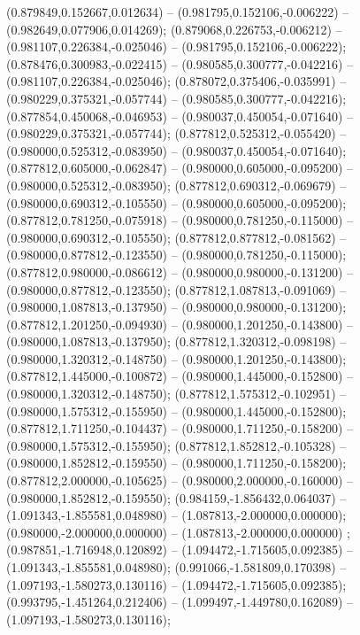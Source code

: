  (0.879849,0.152667,0.012634) -- (0.981795,0.152106,-0.006222) -- (0.982649,0.077906,0.014269);
 (0.879068,0.226753,-0.006212) -- (0.981107,0.226384,-0.025046) -- (0.981795,0.152106,-0.006222);
 (0.878476,0.300983,-0.022415) -- (0.980585,0.300777,-0.042216) -- (0.981107,0.226384,-0.025046);
 (0.878072,0.375406,-0.035991) -- (0.980229,0.375321,-0.057744) -- (0.980585,0.300777,-0.042216);
 (0.877854,0.450068,-0.046953) -- (0.980037,0.450054,-0.071640) -- (0.980229,0.375321,-0.057744);
 (0.877812,0.525312,-0.055420) -- (0.980000,0.525312,-0.083950) -- (0.980037,0.450054,-0.071640);
 (0.877812,0.605000,-0.062847) -- (0.980000,0.605000,-0.095200) -- (0.980000,0.525312,-0.083950);
 (0.877812,0.690312,-0.069679) -- (0.980000,0.690312,-0.105550) -- (0.980000,0.605000,-0.095200);
 (0.877812,0.781250,-0.075918) -- (0.980000,0.781250,-0.115000) -- (0.980000,0.690312,-0.105550);
 (0.877812,0.877812,-0.081562) -- (0.980000,0.877812,-0.123550) -- (0.980000,0.781250,-0.115000);
 (0.877812,0.980000,-0.086612) -- (0.980000,0.980000,-0.131200) -- (0.980000,0.877812,-0.123550);
 (0.877812,1.087813,-0.091069) -- (0.980000,1.087813,-0.137950) -- (0.980000,0.980000,-0.131200);
 (0.877812,1.201250,-0.094930) -- (0.980000,1.201250,-0.143800) -- (0.980000,1.087813,-0.137950);
 (0.877812,1.320312,-0.098198) -- (0.980000,1.320312,-0.148750) -- (0.980000,1.201250,-0.143800);
 (0.877812,1.445000,-0.100872) -- (0.980000,1.445000,-0.152800) -- (0.980000,1.320312,-0.148750);
 (0.877812,1.575312,-0.102951) -- (0.980000,1.575312,-0.155950) -- (0.980000,1.445000,-0.152800);
 (0.877812,1.711250,-0.104437) -- (0.980000,1.711250,-0.158200) -- (0.980000,1.575312,-0.155950);
 (0.877812,1.852812,-0.105328) -- (0.980000,1.852812,-0.159550) -- (0.980000,1.711250,-0.158200);
 (0.877812,2.000000,-0.105625) -- (0.980000,2.000000,-0.160000) -- (0.980000,1.852812,-0.159550);
 (0.984159,-1.856432,0.064037) -- (1.091343,-1.855581,0.048980) -- (1.087813,-2.000000,0.000000);
 (0.980000,-2.000000,0.000000) -- (1.087813,-2.000000,0.000000) ;
 (0.987851,-1.716948,0.120892) -- (1.094472,-1.715605,0.092385) -- (1.091343,-1.855581,0.048980);
 (0.991066,-1.581809,0.170398) -- (1.097193,-1.580273,0.130116) -- (1.094472,-1.715605,0.092385);
 (0.993795,-1.451264,0.212406) -- (1.099497,-1.449780,0.162089) -- (1.097193,-1.580273,0.130116);

